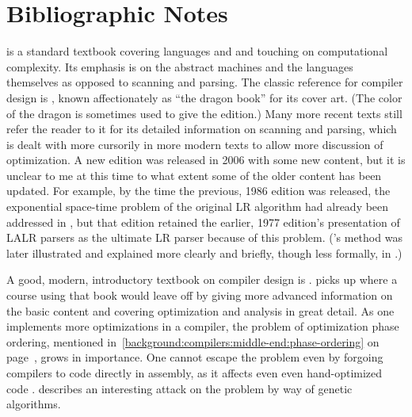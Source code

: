 \section{Bibliographic Notes}\label{background:compilers:bibliographicnotes}
 is a standard textbook covering languages and \TMs and touching on computational complexity. Its emphasis is on the abstract machines and the languages themselves as opposed to scanning and parsing. The classic reference for compiler design is \citet{Aho:Compilers:2006}, known affectionately as ``the dragon book'' for its cover art. (The color of the dragon is sometimes used to give the edition.) Many more recent texts still refer the reader to it for its detailed information on scanning and parsing, which is dealt with more cursorily in more modern texts to allow more discussion of optimization. A new edition was released in 2006 with some new content, but it is unclear to me at this time to what extent some of the older content has been updated. For example, by the time the previous, 1986 edition \citep{Aho:Compilers:1986} was released, the exponential space-time problem of the original LR algorithm had already been addressed in \citet{Pager:The-lane:1973}, but that edition retained the earlier, 1977 edition's \citep{Aho:Principles:1977} presentation of LALR parsers as the ultimate LR parser because of this problem. ('s method was later illustrated and explained more clearly and briefly, though less formally, in \citet{Spector:Efficient:1988}.)

A good, modern, introductory textbook on compiler design is \citet{Cooper:Engineering:2004}.  picks up where a course using that book would leave off by giving more advanced information on the basic content and covering optimization and analysis in great detail. As one implements more optimizations in a compiler, the problem of optimization phase ordering, mentioned in~\ref{background:compilers:middle-end:phase-ordering} on page~\pageref{background:compilers:middle-end:phase-ordering}, grows in importance. One cannot escape the problem even by forgoing compilers to code directly in assembly, as it affects even even hand-optimized code \citep{Hines:Using:2005}.  describes an interesting attack on the problem by way of genetic algorithms.

